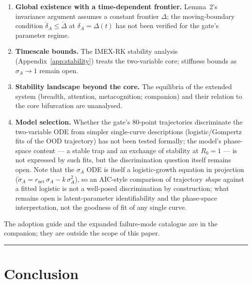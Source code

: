 \documentclass{article}
\theoremstyle{definition}
\begin{document}
\begin{enumerate}[nosep]
\item \textbf{Global existence with a time-dependent frontier.}
  Lemma~2's invariance argument assumes a constant frontier $\Delta$;
  the moving-boundary condition $\dot{\delta}_A \leq \dot{\Delta}$ at
  $\delta_A = \Delta(t)$ has not been verified for the gate's parameter
  regime.
\item \textbf{Timescale bounds.}
  The IMEX-RK stability analysis (Appendix~\ref{app:stability}) treats
  the two-variable core; stiffness bounds as $\sigma_A \to 1$ remain
  open.
\item \textbf{Stability landscape beyond the core.}
  The equilibria of the extended system (breadth, attention,
  metacognition; companion) and their relation to the core bifurcation
  are unanalysed.
\item \textbf{Model selection.}
  Whether the gate's 80-point trajectories discriminate the two-variable
  ODE from simpler single-curve descriptions (logistic/Gompertz fits of
  the OOD trajectory) has not been tested formally; the model's
  phase-space content --- a stable trap and an exchange of stability at
  $R_0 = 1$ --- is not expressed by such fits, but the discrimination
  question itself remains open. Note that the $\sigma_A$ ODE is itself a
  logistic-growth equation in projection
  ($\dot{\sigma}_A = r_{\text{net}}\,\sigma_A - k\,\sigma_A^2$), so an
  AIC-style comparison of trajectory \emph{shape} against a fitted
  logistic is not a well-posed discrimination by construction; what
  remains open is latent-parameter identifiability and the phase-space
  interpretation, not the goodness of fit of any single curve.
\end{enumerate}

The adoption guide and the expanded failure-mode catalogue are in the
companion; they are outside the scope of this paper.

\noindent\rule{\linewidth}{0.4pt}

\section{Conclusion}\label{sec:conclusion}
\end{document}
